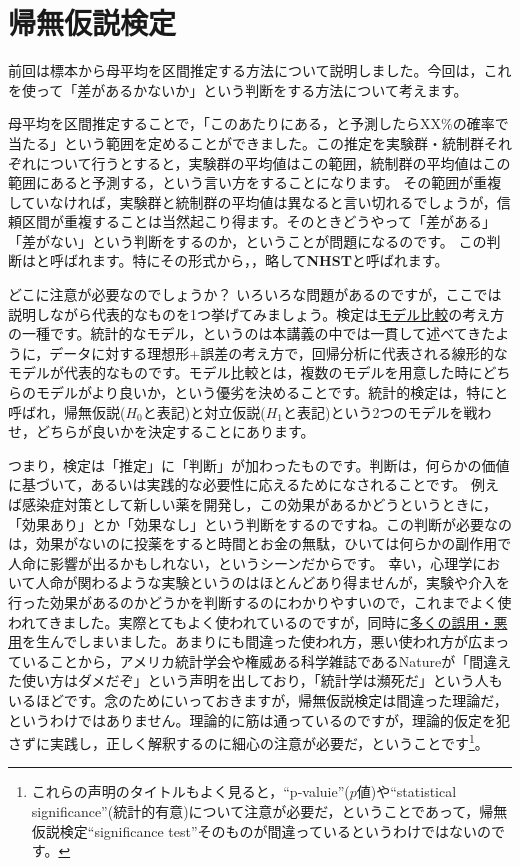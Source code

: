 \documentclass{ltjsbook}
\begin{document}
\chapter{帰無仮説検定}
\label{chapter18}
前回は標本から母平均を区間推定する方法について説明しました。今回は，これを使って「差があるかないか」という判断をする方法について考えます。

母平均を区間推定することで，「このあたりにある，と予測したらXX\%の確率で当たる」という範囲を定めることができました。この推定を実験群・統制群それぞれについて行うとすると，実験群の平均値はこの範囲，統制群の平均値はこの範囲にあると予測する，という言い方をすることになります。
その範囲が重複していなければ，実験群と統制群の平均値は異なると言い切れるでしょうが，信頼区間が重複することは当然起こり得ます。そのときどうやって「差がある」「差がない」という判断をするのか，ということが問題になるのです。
この判断はと呼ばれます。特にその形式から，，略して\textbf{NHST}と呼ばれます。

\label{ModelComparison1}
どこに注意が必要なのでしょうか？ いろいろな問題があるのですが，ここでは説明しながら代表的なものを1つ挙げてみましょう。検定は\underline{モデル比較}の考え方の一種です。統計的なモデル，というのは本講義の中では一貫して述べてきたように，データに対する理想形+誤差の考え方で，回帰分析に代表される線形的なモデルが代表的なものです。モデル比較とは，複数のモデルを用意した時にどちらのモデルがより良いか，という優劣を決めることです。統計的検定は，特にと呼ばれ，帰無仮説($H_0$と表記)と対立仮説($H_1$と表記)という2つのモデルを戦わせ，どちらが良いかを決定することにあります。

つまり，検定は「推定」に「判断」が加わったものです。判断は，何らかの価値に基づいて，あるいは実践的な必要性に応えるためになされることです。
例えば感染症対策として新しい薬を開発し，この効果があるかどうというときに，「効果あり」とか「効果なし」という判断をするのですね。この判断が必要なのは，効果がないのに投薬をすると時間とお金の無駄，ひいては何らかの副作用で人命に影響が出るかもしれない，というシーンだからです。
幸い，心理学において人命が関わるような実験というのはほとんどあり得ませんが，実験や介入を行った効果があるのかどうかを判断するのにわかりやすいので，これまでよく使われてきました。実際とてもよく使われているのですが，同時に\underline{多くの誤用・悪用}を生んでしまいました。あまりにも間違った使われ方，悪い使われ方が広まっていることから，アメリカ統計学会や権威ある科学雑誌であるNatureが「間違えた使い方はダメだぞ」という声明を出しており\citep{wasserstein2016asa,amrhein2019scientists}，「統計学は瀕死だ」という人もいるほどです\citep{豊田202003}。念のためにいっておきますが，帰無仮説検定は間違った理論だ，というわけではありません。理論的に筋は通っているのですが，理論的仮定を犯さずに実践し，正しく解釈するのに細心の注意が必要だ，ということです\footnote{これらの声明のタイトルもよく見ると，``p-valuie''($p$値)や``statistical significance''(統計的有意)について注意が必要だ，ということであって，帰無仮説検定``significance test''そのものが間違っているというわけではないのです。}。
\end{document}
